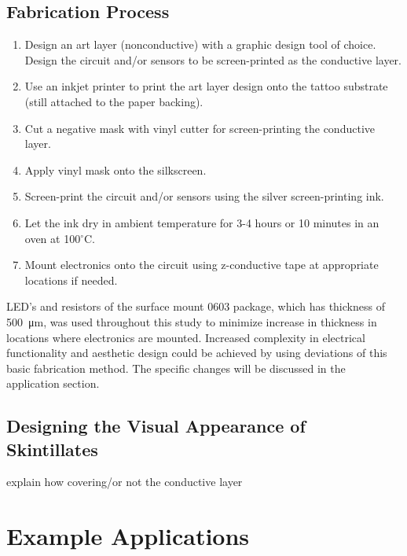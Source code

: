 \documentclass{sigchi}
\begin{document}
\subsection{Fabrication Process}

\begin{enumerate}
  \item Design an art layer (nonconductive) with a graphic design tool of choice. Design the circuit and/or sensors to be screen-printed as the conductive layer.
  \item Use an inkjet printer to print the art layer design onto the tattoo substrate (still attached to the paper backing). 
  \item Cut a negative mask with vinyl cutter for screen-printing the conductive layer. 
  \item Apply vinyl mask onto the silkscreen. 
  \item Screen-print the circuit and/or sensors using the silver screen-printing ink.
  \item Let the ink dry in ambient temperature for 3-4 hours or 10 minutes in an oven at 100$^{\circ}$C. 
  \item Mount electronics onto the circuit using z-conductive tape at appropriate locations if needed.   
\end{enumerate}
LED's and resistors of the surface mount 0603 package, which has thickness of  \SI{500}{\micro\metre}, was used throughout this study to minimize increase in thickness in locations where electronics are mounted. Increased complexity in electrical functionality and aesthetic design could be achieved by using deviations of this basic fabrication method. The specific changes will be discussed in the application section. 

\subsection{Designing the Visual Appearance of Skintillates}
explain how covering/or not the conductive layer

\section{Example Applications}
\end{document}
